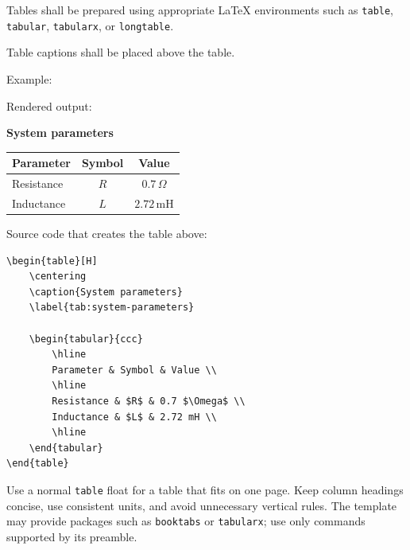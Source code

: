 {\vspace{0.3cm}



Tables shall be prepared using appropriate \LaTeX{} environments
such as \verb|table|, \verb|tabular|, \verb|tabularx|, or
\verb|longtable|.

Table captions shall be placed above the table.

Example:

\RegExample Rendered output:

\begin{center}
\textbf{System parameters}\par\smallskip
\begin{tabular}{|l|c|c|}
    \hline
    Parameter & Symbol & Value \\
    \hline
    Resistance & $R$ & $0.7\,\Omega$ \\
    Inductance & $L$ & $2.72\,\mathrm{mH}$ \\
    \hline
\end{tabular}
\end{center}

Source code that creates the table above:

\begin{verbatim}
\begin{table}[H]
    \centering
    \caption{System parameters}
    \label{tab:system-parameters}

    \begin{tabular}{ccc}
        \hline
        Parameter & Symbol & Value \\
        \hline
        Resistance & $R$ & 0.7 $\Omega$ \\
        Inductance & $L$ & 2.72 mH \\
        \hline
    \end{tabular}
\end{table}
\end{verbatim}


Use a normal \verb|table| float for a table that fits on one page.
Keep column headings concise, use consistent units, and avoid
unnecessary vertical rules. The template may provide packages such as
\verb|booktabs| or \verb|tabularx|; use only commands supported by its
preamble.

}
